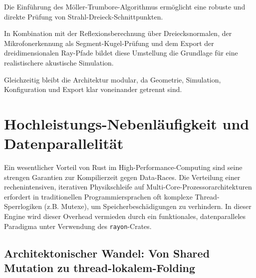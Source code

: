 \documentclass{article}
\begin{document}
    Die Einführung des Möller-Trumbore-Algorithmus ermöglicht eine robuste und
    direkte Prüfung von Strahl-Dreieck-Schnittpunkten.

    In Kombination mit der Reflexionsberechnung über Dreiecksnormalen, der
    Mikrofonerkennung als Segment-Kugel-Prüfung und dem Export der
    dreidimensionalen Ray-Pfade bildet diese Umstellung die Grundlage für eine
    realistischere akustische Simulation.

    Gleichzeitig bleibt die Architektur modular, da Geometrie, Simulation,
    Konfiguration und Export klar voneinander getrennt sind.

    \section{Hochleistungs-Nebenläufigkeit und Datenparallelität}
    \label{sec:concurrency}


    Ein wesentlicher Vorteil von Rust im High-Performance-Computing sind seine strengen Garantien zur Kompilierzeit gegen Data-Races.
    Die Verteilung einer rechenintensiven, iterativen Physikschleife auf Multi-Core-Prozessorarchitekturen erfordert in traditionellen
    Programmiersprachen oft komplexe Thread-Sperrlogiken (z.B. Mutexe), um Speicherbeschädigungen zu verhindern.
    In dieser Engine wird dieser Overhead vermieden durch ein funktionales, datenparalleles Paradigma unter Verwendung des \texttt{rayon}-Crates.

    \subsection{Architektonischer Wandel: Von Shared Mutation zu thread-lokalem-Folding}\label{subsec:architectural-shift:-from-shared-mutation-to-thread-local-folding}

\end{document}
